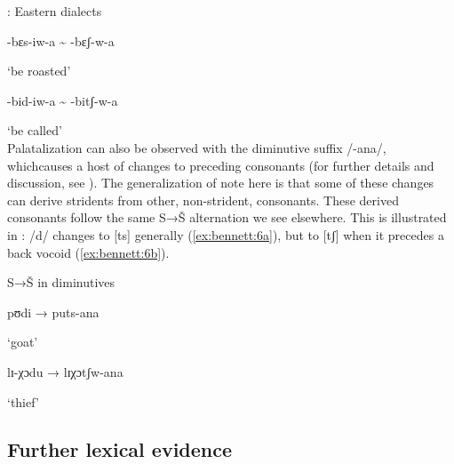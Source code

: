 \documentclass[output=paper,newtxmath,modfonts,nonflat]{langsci/langscibook}
\begin{document}
\ea\label{ex:bennett:5}
: Eastern dialects \citep{Cole1955}\\
\ea\label{ex:bennett:5a}

-bɛs-iw-a {\textasciitilde} -bɛʃ-w-a

     ‘be roasted’\\
\ex\label{ex:bennett:5b}

-bid-iw-a  {\textasciitilde} -bitʃ-w-a

     ‘be called’\\
\z
\z
Palatalization can also be observed with the diminutive suffix /-ana/, which\linebreak causes a host of changes to preceding consonants (for further details and discussion, see \citealt{Cole1955,Louw1975,Herbert1990,Bateman:2007aa,Kotze&Zerbian2008}). The generalization of note here is that some of these changes can derive stridents from other, non-strident, consonants. These derived consonants follow the same S→Š alternation we see elsewhere. This is illustrated in : /d/ changes to [ts] generally (\ref{ex:bennett:6a}), but to [tʃ] when it precedes a back vocoid (\ref{ex:bennett:6b}). 

\ea\label{ex:bennett:6}
S→Š in diminutives \citep{Cole1955}\\
\ea\label{ex:bennett:6a}

pʊdi  → puts-ana

     ‘goat’\\
\ex\label{ex:bennett:6b}

lɪ-χɔdu  → lɪχɔtʃw-ana

     ‘thief’\\
\z
\z

\subsection{Further lexical evidence}\label{sec:bennett:2.5}
\end{document}
